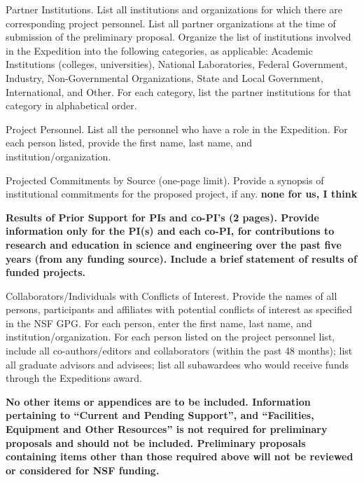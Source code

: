 \documentclass [10pt]{article}
\begin{document}
\begin{outline}
\2 Partner Institutions. List all institutions and organizations for which there are corresponding project personnel. List all partner organizations at the time of submission of the preliminary proposal.  Organize the list of institutions involved in the Expedition into the following categories, as applicable: Academic Institutions (colleges, universities), National Laboratories, Federal Government, Industry, Non-Governmental Organizations, State and Local Government, International, and Other. For each category, list the partner institutions for that category in alphabetical order. 

\2 Project Personnel. List all the personnel who have a role in the Expedition.  For each person listed, provide the first name, last name, and institution/organization. 

\1 Projected Commitments by Source (one-page limit).  Provide a synopsis of institutional commitments for the proposed project, if any. {\bf none for us, I think}

\1 {\bf Results of Prior Support for PIs and co-PI's (2 pages).  Provide information only for the PI(s) and each co-PI, for contributions to research and education in science and engineering over the past five years (from any funding source).  Include a brief statement of results of funded projects.}

\1 Collaborators/Individuals with Conflicts of Interest.   Provide the names of all persons, participants and affiliates with potential conflicts of interest as specified in the NSF GPG. For each person, enter the first name, last name, and institution/organization.  For each person listed on the project personnel list, include all co-authors/editors and collaborators (within the past 48 months); list all graduate advisors and advisees; list all subawardees who would receive funds through the Expeditions award. 

\1 {\bf No other items or appendices are to be included. Information pertaining to ``Current and Pending Support'', and ``Facilities, Equipment and Other Resources'' is not required for preliminary proposals and should not be included. Preliminary proposals containing items other than those required above will not be reviewed or considered for NSF funding.}



\end{outline}
\end{document}
